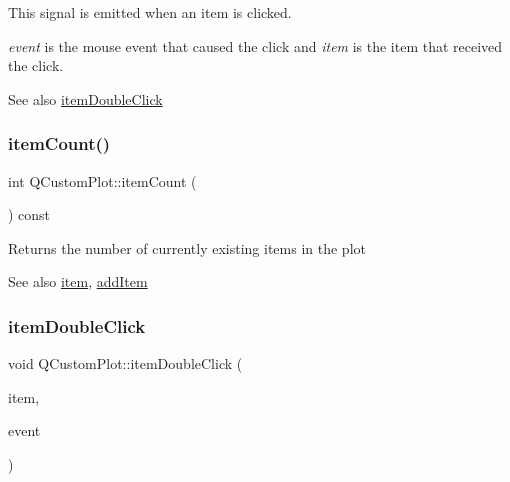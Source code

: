 This signal is emitted when an item is clicked.

{\itshape event} is the mouse event that caused the click and {\itshape item} is the item that received the click.

\begin{DoxySeeAlso}{See also}
\mbox{\hyperlink{class_q_custom_plot_ac83aa9f5a3e9bb3efc9cdc763dcd42a6}{item\+Double\+Click}} 
\end{DoxySeeAlso}
\mbox{\label{class_q_custom_plot_a16025daf0341f9362be3080e404424c2}} 
\subsubsection{\texorpdfstring{item\+Count()}{itemCount()}}
{\footnotesize\ttfamily int Q\+Custom\+Plot\+::item\+Count (\begin{DoxyParamCaption}{ }\end{DoxyParamCaption}) const}

Returns the number of currently existing items in the plot

\begin{DoxySeeAlso}{See also}
\mbox{\hyperlink{class_q_custom_plot_ac042f2e78edd228ccf2f26b7fe215239}{item}}, \mbox{\hyperlink{class_q_custom_plot_aa500620379262321685cb7a7674cbd2a}{add\+Item}} 
\end{DoxySeeAlso}
\mbox{\label{class_q_custom_plot_ac83aa9f5a3e9bb3efc9cdc763dcd42a6}} 
\subsubsection{\texorpdfstring{item\+Double\+Click}{itemDoubleClick}}
{\footnotesize\ttfamily void Q\+Custom\+Plot\+::item\+Double\+Click (\begin{DoxyParamCaption}\item[{\mbox{\hyperlink{class_q_c_p_abstract_item}{Q\+C\+P\+Abstract\+Item}} $\ast$}]{item,  }\item[{Q\+Mouse\+Event $\ast$}]{event }\end{DoxyParamCaption})\hspace{0.3cm}{\ttfamily [signal]}}

